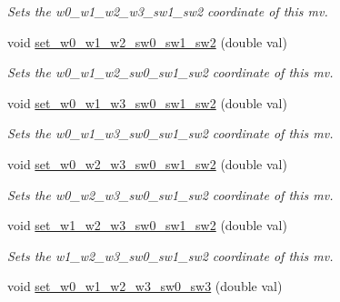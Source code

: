 \begin{DoxyCompactItemize}
\begin{DoxyCompactList}\small\item\em Sets the w0\-\_\-w1\-\_\-w2\-\_\-w3\-\_\-sw1\-\_\-sw2 coordinate of this mv. \end{DoxyCompactList}\item 
\hypertarget{classe3ga_1_1mv_ad0cb5f89211e08add50748a8198e4fbc}{void \hyperlink{classe3ga_1_1mv_ad0cb5f89211e08add50748a8198e4fbc}{set\-\_\-w0\-\_\-w1\-\_\-w2\-\_\-sw0\-\_\-sw1\-\_\-sw2} (double val)}\label{classe3ga_1_1mv_ad0cb5f89211e08add50748a8198e4fbc}

\begin{DoxyCompactList}\small\item\em Sets the w0\-\_\-w1\-\_\-w2\-\_\-sw0\-\_\-sw1\-\_\-sw2 coordinate of this mv. \end{DoxyCompactList}\item 
\hypertarget{classe3ga_1_1mv_a2ad6567b1a758bead8b841cd476347c5}{void \hyperlink{classe3ga_1_1mv_a2ad6567b1a758bead8b841cd476347c5}{set\-\_\-w0\-\_\-w1\-\_\-w3\-\_\-sw0\-\_\-sw1\-\_\-sw2} (double val)}\label{classe3ga_1_1mv_a2ad6567b1a758bead8b841cd476347c5}

\begin{DoxyCompactList}\small\item\em Sets the w0\-\_\-w1\-\_\-w3\-\_\-sw0\-\_\-sw1\-\_\-sw2 coordinate of this mv. \end{DoxyCompactList}\item 
\hypertarget{classe3ga_1_1mv_acb328e02d72579fd1b1978e08ccb696b}{void \hyperlink{classe3ga_1_1mv_acb328e02d72579fd1b1978e08ccb696b}{set\-\_\-w0\-\_\-w2\-\_\-w3\-\_\-sw0\-\_\-sw1\-\_\-sw2} (double val)}\label{classe3ga_1_1mv_acb328e02d72579fd1b1978e08ccb696b}

\begin{DoxyCompactList}\small\item\em Sets the w0\-\_\-w2\-\_\-w3\-\_\-sw0\-\_\-sw1\-\_\-sw2 coordinate of this mv. \end{DoxyCompactList}\item 
\hypertarget{classe3ga_1_1mv_a580469d31dbae51e69b956242696c189}{void \hyperlink{classe3ga_1_1mv_a580469d31dbae51e69b956242696c189}{set\-\_\-w1\-\_\-w2\-\_\-w3\-\_\-sw0\-\_\-sw1\-\_\-sw2} (double val)}\label{classe3ga_1_1mv_a580469d31dbae51e69b956242696c189}

\begin{DoxyCompactList}\small\item\em Sets the w1\-\_\-w2\-\_\-w3\-\_\-sw0\-\_\-sw1\-\_\-sw2 coordinate of this mv. \end{DoxyCompactList}\item 
\hypertarget{classe3ga_1_1mv_a88f9a4a7fcd22f0efb3d57f5d366de74}{void \hyperlink{classe3ga_1_1mv_a88f9a4a7fcd22f0efb3d57f5d366de74}{set\-\_\-w0\-\_\-w1\-\_\-w2\-\_\-w3\-\_\-sw0\-\_\-sw3} (double val)}\label{classe3ga_1_1mv_a88f9a4a7fcd22f0efb3d57f5d366de74}


\end{DoxyCompactItemize}
